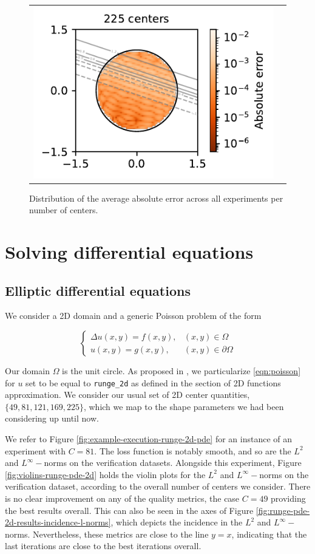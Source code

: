 \documentclass[12pt]{report} %
\newcommand{\mathLaplace}{\Delta}
\begin{document}
\begin{figure}
\begin{tabular}{ccl}
    \multicolumn{2}{l}{\includegraphics[width=.4\textwidth, clip=true,trim={0 0 2.1cm 0}]{imagenes/experiments/2d/statistical_2d_full_scheduler_interpolation/arctan_2d/arctan_paper_2d_225.pdf}} &
  \end{tabular}
  \caption{Distribution of the average absolute error across all experiments per number of centers.}
  \label{fig:arctan-2d-results-errors-avg}
\end{figure}

\clearpage
\section{Solving differential equations}

\subsection{Elliptic differential equations}

We consider a 2D domain and a generic Poisson problem of the form

\begin{equation}
  \left\{\begin{array}{ll}
    \mathLaplace u (x, y) = f (x, y), & (x, y) \in \Omega          \\
    u (x, y) = g (x, y),              & (x, y) \in \partial \Omega
  \end{array}\right. \label{eqn:poisson}
\end{equation}

Our domain $\Omega$ is the unit circle. As proposed in \cite{larsson2003numerical}, we particularize \eqref{eqn:poisson} for $u$ set to be equal to \texttt{runge\_2d} as defined in the section of 2D functions approximation. We consider our usual set of 2D center quantities, $\{49,81,121,169,225\}$, which we map to the shape parameters we had been considering up until now.

We refer to Figure \ref{fig:example-execution-runge-2d-pde} for an instance of an experiment with $C=81$. The loss function is notably smooth, and so are the $L^2$ and $L^\infty-$norms on the verification datasets. Alongside this experiment, Figure \ref{fig:violins-runge-pde-2d} holds the violin plots for the $L^2$ and $L^\infty-$norms on the verification dataset, according to the overall number of centers we consider. There is no clear improvement on any of the quality metrics, the case $C=49$ providing the best results overall. This can also be seen in the axes of Figure \ref{fig:runge-pde-2d-results-incidence-l-norms}, which depicts the incidence in the $L^2$ and $L^\infty-$norms. Nevertheless, these metrics are close to the line $y=x$, indicating that the last iterations are close to the best iterations overall.
\end{document}
